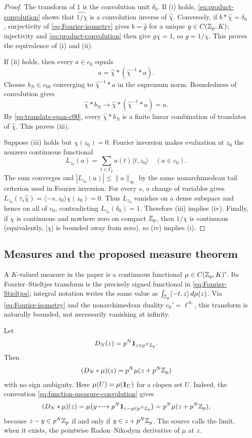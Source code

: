 \begin{proof}
The transform of $1$ is the convolution unit $\delta_0$.  If (i) holds,
\cref{eq:product-convolution} shows that
$\widehat{1/\chi}$ is a convolution inverse of $\widehat\chi$.  Conversely,
if $b*\widehat\chi=\delta_0$, surjectivity of \cref{eq:Fourier-isometry}
gives $b=\widehat g$ for a unique $g\in C(\mathbb Z_p,K)$; injectivity and
\cref{eq:product-convolution} then give $g\chi=1$, so $g=1/\chi$.  This proves
the equivalence of (i) and (ii).

If (ii) holds, then every $a\in c_0$ equals
\[
 a=\widehat\chi*(\widehat\chi^{-1}*a).
\]
Choose $b_N\in c_{00}$ converging to
$\widehat\chi^{-1}*a$ in the supremum norm.  Boundedness of convolution gives
\[
 \widehat\chi*b_N\longrightarrow
 \widehat\chi*(\widehat\chi^{-1}*a)=a.
\]
By \cref{eq:translate-span-c00}, every $\widehat\chi*b_N$ is a finite linear
combination of translates of $\widehat\chi$.  This proves (iii).

Suppose (iii) holds but $\chi(z_0)=0$.  Fourier inversion makes evaluation
at $z_0$ the nonzero continuous functional
\[
 L_{z_0}(a)=\sum_{t\in\Gamma_p}a(t)\langle t,z_0\rangle
 \quad(a\in c_0).
\]
The sum converges and $|L_{z_0}(a)|\leq\|a\|_\infty$ by the same
nonarchimedean tail criterion used in Fourier inversion.
For every $s$, a change of variables gives
$L_{z_0}(\tau_s\widehat\chi)
=\langle-s,z_0\rangle\chi(z_0)=0$.  Thus $L_{z_0}$ vanishes on a dense
subspace and hence on all of
$c_0$, contradicting $L_{z_0}(\delta_0)=1$.  Therefore (iii) implies (iv).
Finally, if $\chi$ is continuous and nowhere zero on compact $\mathbb Z_p$, then
$1/\chi$ is continuous (equivalently, $|\chi|$ is bounded away from zero),
so (iv) implies (i).
\end{proof}

\subsection{Measures and the proposed measure theorem}

A $K$-valued measure in the paper is a continuous functional
$\mu\in C(\mathbb Z_p,K)'$.  Its Fourier--Stieltjes transform is the precisely
signed functional in \cref{eq:Fourier-Stieltjes}; integral notation writes
the same value as
$\int_{\mathbb Z_p}\langle-t,z\rangle\,d\mu(z)$.
Via \cref{eq:Fourier-isometry} and the nonarchimedean duality
$c_0'=\ell^\infty$, this transform is naturally bounded, not necessarily
vanishing at infinity.

Let
\begin{equation}
\label{eq:Dirichlet-kernel-padic}
 D_N(z)=p^N\mathbf 1_{z\in p^N\mathbb Z_p}.
\end{equation}
Then
\begin{equation}
\label{eq:measure-local-density}
 (D_N*\mu)(z)=p^N\mu(z+p^N\mathbb Z_p)
\end{equation}
with no sign ambiguity.  Here $\mu(U)=\mu(\mathbf 1_{U})$ for a clopen set $U$.
Indeed, the convention \cref{eq:function-measure-convolution} gives
\[
 (D_N*\mu)(z)
 =\mu\bigl(y\longmapsto p^N\mathbf 1_{z-y\in p^N\mathbb Z_p}\bigr)
 =p^N\mu(z+p^N\mathbb Z_p),
\]
because $z-y\in p^N\mathbb Z_p$ if and only if
$y\in z+p^N\mathbb Z_p$.  The source calls the limit, when it exists, the
pointwise Radon--Nikodym derivative of $\mu$ at $z$.

